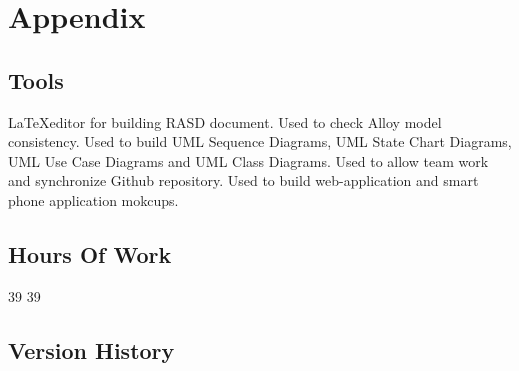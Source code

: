 \section{Appendix}
\subsection{Tools}
\begin{itemize}
	 \LaTeX editor for building RASD document.
	 Used to check Alloy model consistency.
	 Used to build UML Sequence Diagrams, UML State Chart Diagrams, UML Use Case Diagrams and UML Class Diagrams.
	 Used to allow team work and synchronize Github repository.
	 Used to build web-application and smart phone application mokcups.
\end{itemize}
\subsection{Hours Of Work}
\begin{itemize}
	 39
	 39
\end{itemize}
\subsection{Version History}
